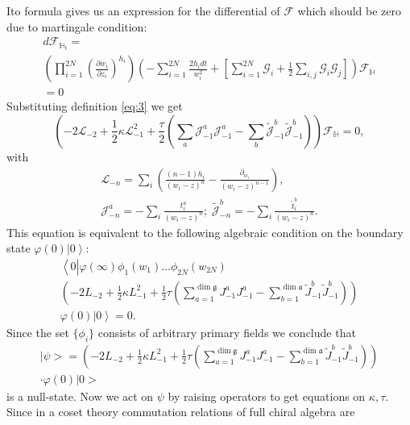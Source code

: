 \documentclass{jetpl}
\newcommand{\gf}{\mathfrak{g}}
\newcommand{\af}{\mathfrak{a}}
\begin{document}
 Ito formula  gives us an expression for the differential of $\mathcal{F}$ which should be zero due to martingale condition:
\begin{multline}
d \mathcal{F}_{\mathbb{H}_{t}}=\\ \left(\prod_{i=1}^{2N}\left(\frac{\partial w_{i}}{\partial z_{i}}\right)^{h_{i}}\right)
\left(-\sum_{i=1}^{2N}\frac{2h_{i}dt}{w_{i}^{2}}+\left[\sum_{i=1}^{2N}\mathcal{G}_{i}+\frac{1}{2}
      \sum_{i,j}\mathcal{G}_{i}\mathcal{G}_{j}\right]\right)\mathcal{F}_{\mathbb{H}}\\=0
\label{eq:8}
\end{multline}
Substituting  definition \eqref{eq:3} we get 
\begin{equation}
  \left(-2 \mathcal{L}_{-2}+\frac{1}{2}\kappa \mathcal{L}_{-1}^{2}+\frac{\tau}{2}\left( \sum_{a} \mathcal{J}^{a}_{-1} \mathcal{J}^{a}_{-1}-
      \sum_{b}\tilde{\mathcal{J}}^{b}_{-1} \tilde{\mathcal{J}}^{b}_{-1}\right)\right)        \mathcal{F}_{\mathbb{H}}=0,
  \label{eq:4}
\end{equation}
with
\begin{eqnarray*}
  \mathcal{L}_{-n}=\sum_{i}\left(\frac{(n-1)h_{i}}{(w_{i}-z)^{n}}-\frac{\partial_{w_{i}}}{(w_{i}-z)^{n-1}}\right),\\ \mathcal{J}^{a}_{{-n}}=-\sum_{i}\frac{t^{a}_{i}}{(w_{i}-z)^{n}};\; \tilde{\mathcal{J}}^{b}_{{-n}}=-\sum_{i}\frac{\tilde{t}^{b}_{i}}{(w_{i}-z)^{n}}.
\end{eqnarray*}
This equation is equivalent to the following algebraic condition on the boundary state $\varphi(0)\left|0\right>$:
\begin{multline}
  \label{eq:7}
  \left<0\left|\varphi(\infty)\phi_{1}(w_{1})\dots\phi_{2N}(w_{2N})\right.\right.\\
  \left(-2L_{-2}+\frac{1}{2}\kappa L_{-1}^{2}+\frac{1}{2}\tau \left(\sum_{a=1}^{\dim\gf}J^{a}_{-1}J^{a}_{-1}-\sum_{b=1}^{\dim\af}\tilde{J}^{b}_{-1}\tilde{J}^{b}_{-1}\right)\right)\\
\left.\varphi(0)|0\right>=0.
\end{multline}
Since the set $\{\phi_{i}\}$ consists of arbitrary primary fields we conclude that 
\begin{multline}
|\psi>=\left(-2L_{-2}+\frac{1}{2}\kappa L_{-1}^{2}+\frac{1}{2}\tau \left(\sum_{a=1}^{\dim\gf}J^{a}_{-1}J^{a}_{-1}-\sum_{b=1}^{\dim\af}\tilde{J}^{b}_{-1}\tilde{J}^{b}_{-1}\right)\right)\\
\cdot\varphi(0)|0>
\end{multline}
is a null-state. Now we act on $\psi$ by raising operators to get equations on $\kappa,\tau$. Since in a coset theory commutation relations of full chiral algebra are
\end{document}
